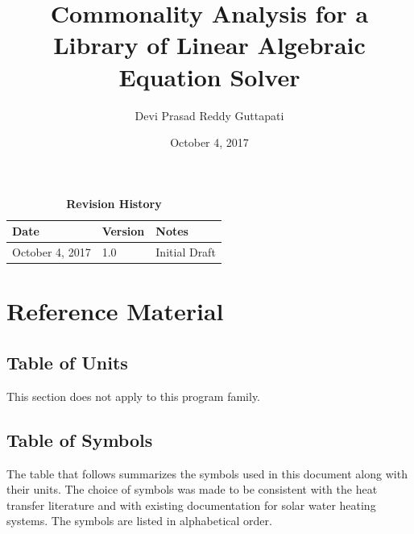 \documentclass[12pt]{article}
\begin{document}
\title{Commonality Analysis for a Library of Linear Algebraic Equation Solver } 
\author{Devi Prasad Reddy Guttapati}
\date{October 4, 2017}
	
\maketitle
\pagebreak
{}
\tableofcontents

\begin{table}[bp]
\caption{\bf Revision History}
\begin{tabularx}{\textwidth}{p{3cm}p{2cm}X}
\toprule {\bf Date} & {\bf Version} & {\bf Notes}\\
\midrule
October 4, 2017 & 1.0 & Initial Draft\\

\bottomrule
\end{tabularx}
\end{table}

\section{Reference Material}



\subsection{Table of Units}

This section does not apply to this program family.

\subsection{Table of Symbols}

The table that follows summarizes the symbols used in this document along with
their units.  The choice of symbols was made to be consistent with the heat
transfer literature and with existing documentation for solar water heating
systems.  The symbols are listed in alphabetical order.
\end{document}
